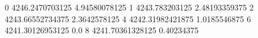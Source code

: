 0 4246.2470703125 4.94580078125
1 4243.783203125 2.48193359375
2 4243.66552734375 2.3642578125
4 4242.31982421875 1.0185546875
6 4241.30126953125 0.0
8 4241.70361328125 0.40234375
